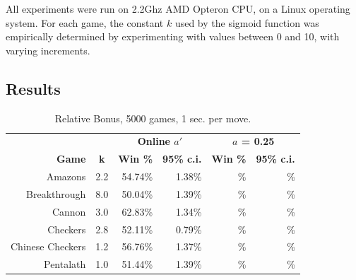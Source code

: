 \documentclass{ecai2014}
\begin{document}
All experiments were run on 2.2Ghz AMD Opteron CPU, on a Linux operating system. For each game, the constant $k$ used by the sigmoid function was empirically determined by experimenting with values between 0 and 10, with varying increments.
\subsection{Results}
\label{subsec:results}

\begin{table}
{\caption{Relative Bonus, 5000 games, 1 sec. per move.} \label{tab:rb}}
\begin{center}
\begin{tabular}{rlrrrr}
\hline
\rule{0pt}{12pt}
&&\multicolumn{2}{c}{\textbf{Online $a'$}}&\multicolumn{2}{c}{\textbf{$a$ = 0.25}} \\
\cline{3-6}
\rule{0pt}{12pt}
\textbf{Game} & \multicolumn{1}{c|}{\textbf{k}} & \textbf{Win \%} & \textbf{95\% c.i.} &\textbf{Win \%} & \textbf{95\% c.i.}\\
\hline
\rule{0pt}{10pt}
Amazons &\multicolumn{1}{l|}{2.2}			& 54.74\% & 1.38\% & \% & \% \\
Breakthrough &\multicolumn{1}{l|}{8.0} 		& 50.04\% & 1.39\% & \% & \% \\
Cannon &\multicolumn{1}{l|}{3.0} 			& 62.83\% & 1.34\% & \% & \% \\
Checkers &\multicolumn{1}{l|}{2.8}			& 52.11\% & 0.79\% & \% & \% \\
Chinese Checkers &\multicolumn{1}{l|}{1.2} 	& 56.76\% & 1.37\% & \% & \% \\
Pentalath &\multicolumn{1}{l|}{1.0} 		& 51.44\% & 1.39\% & \% & \% \\
\hline
\end{tabular}
\end{center}
\end{table}
\end{document}
